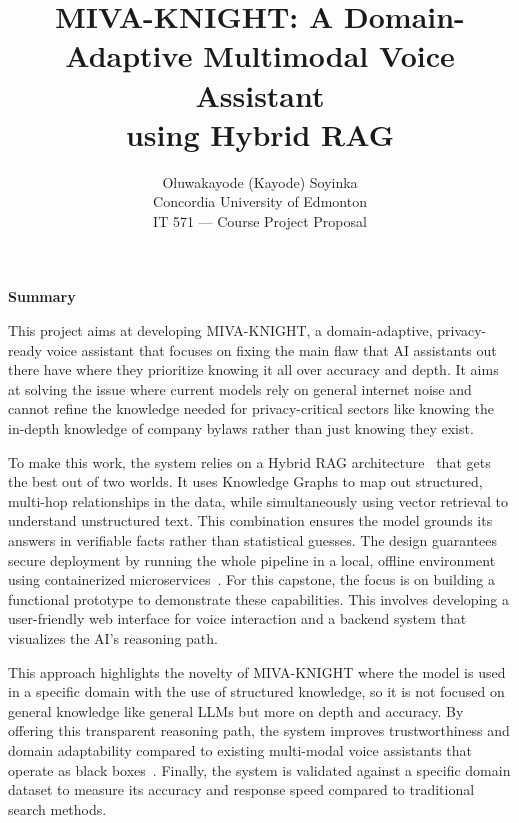 \documentclass[12pt, a4paper]{article}
\title{\textbf{MIVA-KNIGHT: A Domain-Adaptive Multimodal Voice Assistant\\[4pt]
       using Hybrid RAG}}
\author{Oluwakayode (Kayode) Soyinka\\[2pt]
        \small Concordia University of Edmonton\\
        \small IT 571 --- Course Project Proposal}
\date{}
\begin{document}
\maketitle
\thispagestyle{empty}

\noindent\textbf{Summary}

\noindent
This project aims at developing MIVA-KNIGHT, a domain-adaptive, privacy-ready
voice assistant that focuses on fixing the main flaw that AI assistants out
there have where they prioritize knowing it all over accuracy and depth. It aims
at solving the issue where current models rely on general internet noise and
cannot refine the knowledge needed for privacy-critical sectors like knowing the
in-depth knowledge of company bylaws rather than just knowing they exist.

To make this work, the system relies on a Hybrid RAG architecture~\cite{sarmah2024hybridrag}
that gets the best out of two worlds. It uses Knowledge Graphs to map out
structured, multi-hop relationships in the data, while simultaneously using
vector retrieval to understand unstructured text. This combination ensures the
model grounds its answers in verifiable facts rather than statistical guesses.
The design guarantees secure deployment by running the whole pipeline in a
local, offline environment using containerized microservices~\cite{lewis2020rag}.
For this capstone, the focus is on building a functional prototype to
demonstrate these capabilities. This involves developing a user-friendly web
interface for voice interaction and a backend system that visualizes the AI's
reasoning path.

This approach highlights the novelty of MIVA-KNIGHT where the model is used
in a specific domain with the use of structured knowledge, so it is not focused
on general knowledge like general LLMs but more on depth and accuracy. By
offering this transparent reasoning path, the system improves trustworthiness
and domain adaptability compared to existing multi-modal voice assistants that
operate as black boxes~\cite{kadam2022multimodal}. Finally, the system is
validated against a specific domain dataset to measure its accuracy and
response speed compared to traditional search methods.

\newpage
\end{document}

